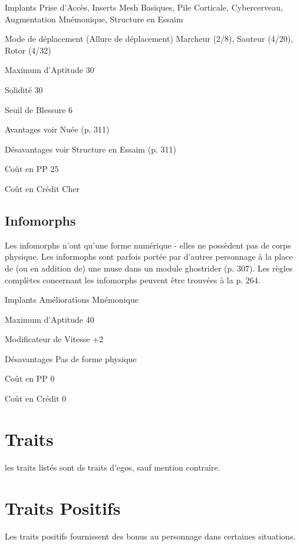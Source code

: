 \begin{description*} \item[Implants] Prise d'Accès, Inserts Mesh Basiques, Pile Corticale, Cybercerveau, Augmentation Mnémonique, Structure en Essaim\item[Mode de déplacement](Allure de déplacement) Marcheur (2/8), Sauteur (4/20), Rotor (4/32) \item[Maximum d'Aptitude] 30 \item[Solidité] 30 \item[Seuil de Blessure] 6 \item[Avantages] voir Nuée (p. 311) \item[Désavantages] voir Structure en Essaim (p. 311) \item[Coût en PP] 25 \item[Coût en Crédit] Cher \end{description*} 

\subsection{Infomorphs} \label{sec:starting-infomorphs} 

Les infomorphs n'ont qu'une forme numérique - elles ne possèdent pas de corps physique. Les informophs sont parfois portée par d'autres personnage à la place de (ou en addition de) une muse dans un module ghostrider (p. 307). Les règles complètes concernant les infomorphs peuvent être trouvées à la p. 264. 

\begin{description*} \item[Implants] Améliorations Mnémonique\item[Maximum d'Aptitude] 40 \item[Modificateur de Vitesse] +2 \item [Désavantages] Pas de forme physique \item[Coût en PP] 0 \item[Coût en Crédit] 0 \end{description*} 

\section{Traits} les traits listés sont ds traits d'egos, sauf mention contraire. 

\section{Traits Positifs} \label{sec:positive-traits} Les traits positifs fournissent des bonus au personnage dans certaines situations. 

